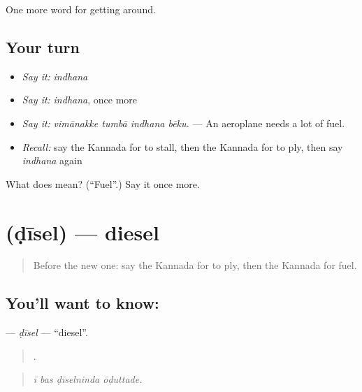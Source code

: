 \begin{grammarlens}[title={What you've built}]
One more word for getting around.
\end{grammarlens}

\subsection*{Your turn}
\begin{itemize}
\raggedright
  \item \emph{Say it:} \emph{indhana}
  \item \emph{Say it:} \emph{indhana}, once more
  \item \emph{Say it:} \emph{vimānakke tumbā indhana bēku.} — An aeroplane needs a lot of fuel.
  \item \emph{Recall:} say the Kannada for to stall, then the Kannada for to ply, then say \emph{indhana} again
\end{itemize}

\begin{tcolorbox}[breakable,colback=teal!4,colframe=teal!35!black,title={Before you move on}]
What does  mean? (\textquotedblleft{}Fuel\textquotedblright{}.) Say it once more.
\end{tcolorbox}
\section[\texorpdfstring{\kn{ಡೀಸೆಲ್} (ḍīsel)}{ಡೀಸೆಲ್ (ḍīsel)}]{ (ḍīsel) — diesel}

\label{lesson:KA-C448-disel}



\begin{quote}
Before the new one: say the Kannada for to ply, then the Kannada for fuel.
\end{quote}

\subsection*{You'll want to know: }
\textbf{} — \emph{ḍīsel} — \textquotedblleft{}diesel\textquotedblright{}.

\begin{quote}
   .
\end{quote}

\begin{quote}
\emph{ī bas ḍīselninda ōḍuttade.}
\end{quote}

